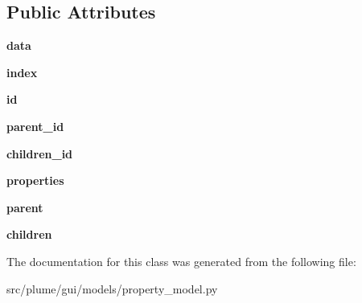 \subsection*{Public Attributes}
\begin{DoxyCompactItemize}
\item 
{\bfseries data}\hypertarget{classplume-creator_1_1src_1_1plume_1_1gui_1_1models_1_1property__model_1_1_list_item_ae1348458cf201c5a40a84e724870d177}{}\label{classplume-creator_1_1src_1_1plume_1_1gui_1_1models_1_1property__model_1_1_list_item_ae1348458cf201c5a40a84e724870d177}

\item 
{\bfseries index}\hypertarget{classplume-creator_1_1src_1_1plume_1_1gui_1_1models_1_1property__model_1_1_list_item_a12e0d686e9d0455af574cfdeca54e2bd}{}\label{classplume-creator_1_1src_1_1plume_1_1gui_1_1models_1_1property__model_1_1_list_item_a12e0d686e9d0455af574cfdeca54e2bd}

\item 
{\bfseries id}\hypertarget{classplume-creator_1_1src_1_1plume_1_1gui_1_1models_1_1property__model_1_1_list_item_a779e64ca68ef055aab355bb972ccb926}{}\label{classplume-creator_1_1src_1_1plume_1_1gui_1_1models_1_1property__model_1_1_list_item_a779e64ca68ef055aab355bb972ccb926}

\item 
{\bfseries parent\+\_\+id}\hypertarget{classplume-creator_1_1src_1_1plume_1_1gui_1_1models_1_1property__model_1_1_list_item_afc838ba9c854fbd5c2c32e299b85d134}{}\label{classplume-creator_1_1src_1_1plume_1_1gui_1_1models_1_1property__model_1_1_list_item_afc838ba9c854fbd5c2c32e299b85d134}

\item 
{\bfseries children\+\_\+id}\hypertarget{classplume-creator_1_1src_1_1plume_1_1gui_1_1models_1_1property__model_1_1_list_item_aa74b97780eb89982d0162b120abcefaa}{}\label{classplume-creator_1_1src_1_1plume_1_1gui_1_1models_1_1property__model_1_1_list_item_aa74b97780eb89982d0162b120abcefaa}

\item 
{\bfseries properties}\hypertarget{classplume-creator_1_1src_1_1plume_1_1gui_1_1models_1_1property__model_1_1_list_item_a6d05387162349e1070e96555a056d197}{}\label{classplume-creator_1_1src_1_1plume_1_1gui_1_1models_1_1property__model_1_1_list_item_a6d05387162349e1070e96555a056d197}

\item 
{\bfseries parent}\hypertarget{classplume-creator_1_1src_1_1plume_1_1gui_1_1models_1_1property__model_1_1_list_item_a87367fffd29ff1a09ffd0ba374043ec9}{}\label{classplume-creator_1_1src_1_1plume_1_1gui_1_1models_1_1property__model_1_1_list_item_a87367fffd29ff1a09ffd0ba374043ec9}

\item 
{\bfseries children}\hypertarget{classplume-creator_1_1src_1_1plume_1_1gui_1_1models_1_1property__model_1_1_list_item_aa28e6a77ac0fce5749afea362164e26e}{}\label{classplume-creator_1_1src_1_1plume_1_1gui_1_1models_1_1property__model_1_1_list_item_aa28e6a77ac0fce5749afea362164e26e}

\end{DoxyCompactItemize}


The documentation for this class was generated from the following file\+:\begin{DoxyCompactItemize}
\item 
src/plume/gui/models/property\+\_\+model.\+py\end{DoxyCompactItemize}
